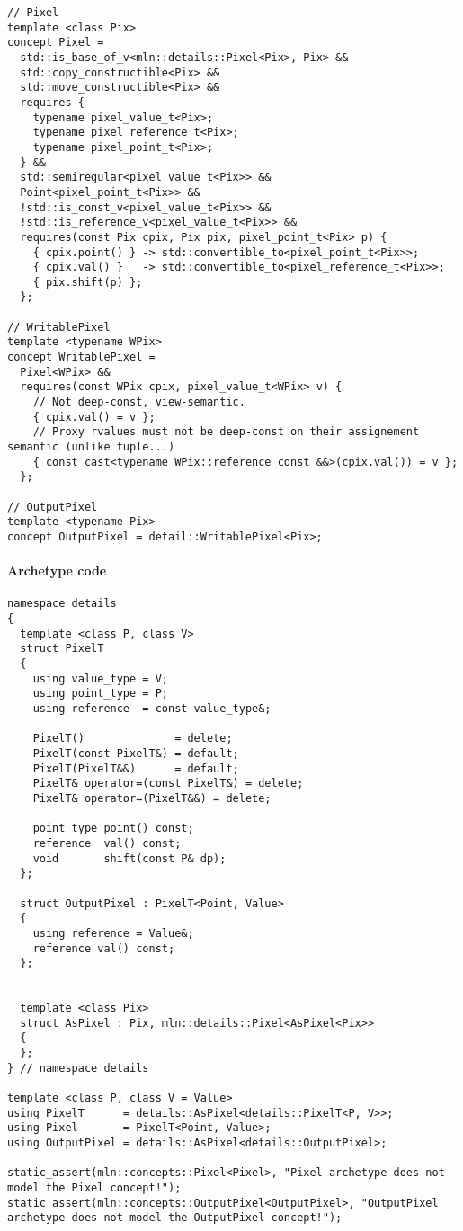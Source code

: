 \begin{verbatim}
// Pixel
template <class Pix>
concept Pixel =
  std::is_base_of_v<mln::details::Pixel<Pix>, Pix> &&
  std::copy_constructible<Pix> &&
  std::move_constructible<Pix> &&
  requires {
    typename pixel_value_t<Pix>;
    typename pixel_reference_t<Pix>;
    typename pixel_point_t<Pix>;
  } &&
  std::semiregular<pixel_value_t<Pix>> &&
  Point<pixel_point_t<Pix>> &&
  !std::is_const_v<pixel_value_t<Pix>> &&
  !std::is_reference_v<pixel_value_t<Pix>> &&
  requires(const Pix cpix, Pix pix, pixel_point_t<Pix> p) {
    { cpix.point() } -> std::convertible_to<pixel_point_t<Pix>>;
    { cpix.val() }   -> std::convertible_to<pixel_reference_t<Pix>>;
    { pix.shift(p) };
  };

// WritablePixel
template <typename WPix>
concept WritablePixel =
  Pixel<WPix> &&
  requires(const WPix cpix, pixel_value_t<WPix> v) {
    // Not deep-const, view-semantic.
    { cpix.val() = v };
    // Proxy rvalues must not be deep-const on their assignement semantic (unlike tuple...)
    { const_cast<typename WPix::reference const &&>(cpix.val()) = v };
  };

// OutputPixel
template <typename Pix>
concept OutputPixel = detail::WritablePixel<Pix>;
\end{verbatim}

\paragraph{Archetype code}

\begin{verbatim}
namespace details
{
  template <class P, class V>
  struct PixelT
  {
    using value_type = V;
    using point_type = P;
    using reference  = const value_type&;

    PixelT()              = delete;
    PixelT(const PixelT&) = default;
    PixelT(PixelT&&)      = default;
    PixelT& operator=(const PixelT&) = delete;
    PixelT& operator=(PixelT&&) = delete;

    point_type point() const;
    reference  val() const;
    void       shift(const P& dp);
  };

  struct OutputPixel : PixelT<Point, Value>
  {
    using reference = Value&;
    reference val() const;
  };


  template <class Pix>
  struct AsPixel : Pix, mln::details::Pixel<AsPixel<Pix>>
  {
  };
} // namespace details

template <class P, class V = Value>
using PixelT      = details::AsPixel<details::PixelT<P, V>>;
using Pixel       = PixelT<Point, Value>;
using OutputPixel = details::AsPixel<details::OutputPixel>;

static_assert(mln::concepts::Pixel<Pixel>, "Pixel archetype does not model the Pixel concept!");
static_assert(mln::concepts::OutputPixel<OutputPixel>, "OutputPixel archetype does not model the OutputPixel concept!");
\end{verbatim}


